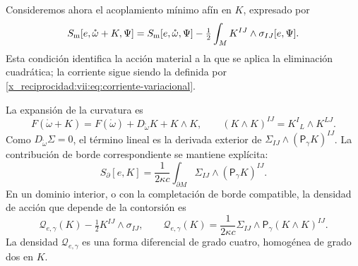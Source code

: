 \begin{HMTCompactSection}
Consideremos ahora el acoplamiento mínimo afín en \(K\), expresado por
\begin{equation}
 S_{\rm m}[e,\mathring\omega+K,\Psi]
 =S_{\rm m}[e,\mathring\omega,\Psi]
   -\tfrac12\int_M K^{IJ}\wedge\sigma_{IJ}[e,\Psi].
 \label{x_reciprocidad:vii:eq:materia-afin-contorsion}
\end{equation}
Esta condición identifica la acción material a la que se aplica la
eliminación cuadrática; la corriente sigue siendo la definida por
\eqref{x_reciprocidad:vii:eq:corriente-variacional}.

La expansión de la curvatura es
\begin{equation}
 F(\mathring\omega+K)
 =F(\mathring\omega)+D_{\mathring\omega}K+K\wedge K,
 \qquad (K\wedge K)^{IJ}=K^I{}_{L}\wedge K^{LJ}.
 \label{x_reciprocidad:vii:eq:curvatura-contorsion}
\end{equation}
Como \(D_{\mathring\omega}\Sigma=0\), el término lineal es la
derivada exterior de \(\Sigma_{IJ}\wedge(\mathsf P_\gamma K)^{IJ}\).
La contribución de borde correspondiente se mantiene explícita:
\begin{equation}
 S_\partial[e,K]=\frac1{2\kappa c}
     \int_{\partial M}\Sigma_{IJ}\wedge(\mathsf P_\gamma K)^{IJ}.
 \label{x_reciprocidad:vii:eq:borde-contorsion}
\end{equation}
En un dominio interior, o con la completación de borde compatible,
la densidad de acción que depende de la contorsión es
\begin{equation}
 \mathcal Q_{e,\gamma}(K)-\tfrac12K^{IJ}\wedge\sigma_{IJ},
 \qquad
 \mathcal Q_{e,\gamma}(K)
  =\frac1{2\kappa c}\Sigma_{IJ}\wedge
                         \mathsf P_\gamma(K\wedge K)^{IJ}.
 \label{x_reciprocidad:vii:eq:forma-cuadratica-contorsion}
\end{equation}
La densidad \(\mathcal Q_{e,\gamma}\) es una forma diferencial de
grado cuatro, homogénea de grado dos en \(K\).


\end{HMTCompactSection}
